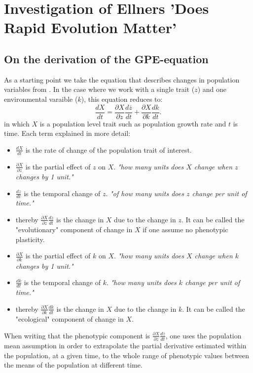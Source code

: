 \graphicspath{{./Appendices/}}
\section{Investigation of Ellners 'Does Rapid Evolution Matter'}
\label{app:gpe}
\subsection{On the derivation of the GPE-equation}
As a starting point we take the equation that describes changes in population variables from \citet[equation 3]{Hairston2005}. In the case where we work with a single trait ($z$) and one environmental varaible ($k$), this equation reduces to:
\begin{equation}
\frac{d X}{d t} = \frac{\partial X}{\partial z}\frac{d\overline{z}}{dt} + \frac{\partial X}{\partial k}\frac{dk}{dt}. 
\end{equation}
in which $X$ is a population level trait such as population growth rate and $t$ is time. Each term explained in more detail:
\begin{itemize}
\item $\frac{dX}{dt}$ is the rate of change of the population trait of interest.
\item $\frac{\partial X}{\partial z}$ is the partial effect of $z$ on $X$. \emph{"how many units does $X$ change when $z$ changes by 1 unit."}
\item $\frac{dz}{dt}$ is the temporal change of $z$. \emph{"of how many units does $z$ change per unit of time."}
\item thereby $\frac{\partial X}{\partial z}\frac{dz}{dt}$ is the change in $X$ due to the change in $z$. It can be called the "evolutionary" component of change in $X$ if one assume no phenotypic plasticity.
\item $\frac{\partial X}{\partial k}$ is the partial effect of $k$ on $X$. \emph{"how many units does $X$ change when $k$ changes by 1 unit."}
\item $\frac{dk}{dt}$ is the temporal change of $k$. \emph{"how many units does $k$ change per unit of time."}
\item thereby $\frac{\partial X}{\partial k}\frac{dk}{dt}$ is the change in $X$ due to the change in $k$. It can be called the "ecological" component of change in $X$.
\end{itemize}

When writing that the phenotypic component is $\frac{\partial X}{\partial z}\frac{d\bar{z}}{dt}$, one uses the population mean assumption in order to extrapolate the partial derivative estimated within the population, at a given time, to the whole range of phenotypic values between the means of the population at different time. 

